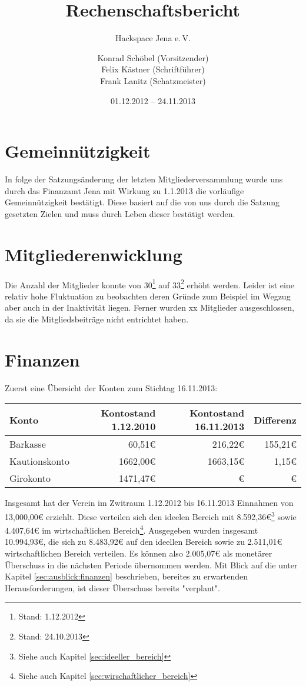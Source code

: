 \documentclass[10pt,DIV16]{scrartcl}
\title{Rechenschaftsbericht}
\subtitle{Hackspace Jena e.\,V.}
\author{%
	Konrad Schöbel (Vorsitzender)\\
    Felix Kästner (Schriftführer)\\
	Frank Lanitz (Schatzmeister)
}
\date{01.12.2012 -- 24.11.2013}
\begin{document}
\maketitle{}

\tableofcontents{}

\newpage{}

\section{Gemeinnützigkeit}

In folge der Satzungsänderung der letzten Mitgliederversammlung wurde 
uns durch das Finanzamt Jena mit Wirkung zu 1.1.2013 die vorläufige 
Gemeinnützigkeit bestätigt. Diese basiert auf die von uns durch die 
Satzung gesetzten Zielen und muss durch Leben dieser bestätigt werden. 

\section{Mitgliederenwicklung}

Die Anzahl der Mitglieder konnte von 30\footnote{Stand: 1.12.2012} auf
33\footnote{Stand: 24.10.2013} erhöht werden. Leider ist eine relativ
hohe Fluktuation zu beobachten deren Gründe zum Beispiel im Wegzug aber
auch in der Inaktivität liegen. Ferner wurden xx Mitglieder
ausgeschlossen, da sie die Mitgliedsbeiträge nicht entrichtet haben.

\section{Finanzen}

Zuerst eine Übersicht der Konten zum Stichtag 16.11.2013:

\begin{table}[h]
\begin{tabular}{l|r|r|r}
\textbf{Konto} & \textbf{Kontostand 1.12.2010} & \textbf{Kontostand 16.11.2013} & \textbf{Differenz} \\ \hline
Barkasse & 60,51\euro & 216,22\euro & 155,21\euro \\
Kautionskonto & 1662,00\euro & 1663,15\euro & 1,15\euro \\
Girokonto & 1471,47\euro & \euro & \euro \\ \hline
\end{tabular}
\end{table}

Insgesamt hat der Verein im Zwitraum 1.12.2012 bis 16.11.2013 Einnahmen 
von 13,000,00\euro{} erziehlt. Diese verteilen sich den ideelen Bereich 
mit 8.592,36\euro\footnote{Siehe auch Kapitel 
\ref{sec:ideeller_bereich}} sowie 4.407,64\euro{} im wirtschaftlichen 
Bereich\footnote{Siehe auch Kapitel \ref{sec:wirschaftlicher_bereich}}. 
Ausgegeben wurden insgesamt 10.994,93\euro, die sich zu 8.483,92\euro{} 
auf den ideellen Bereich sowie zu 2.511,01\euro{} wirtschaftlichen 
Bereich verteilen. Es können also 2.005,07\euro{} als monetärer 
Überschuss in die nächsten Periode übernommen werden. Mit Blick auf die 
unter Kapitel \ref{sec:ausblick:finanzen} beschrieben, bereites zu 
erwartenden Herausforderungen, ist dieser Überschuss bereits 
"verplant".
\end{document}
